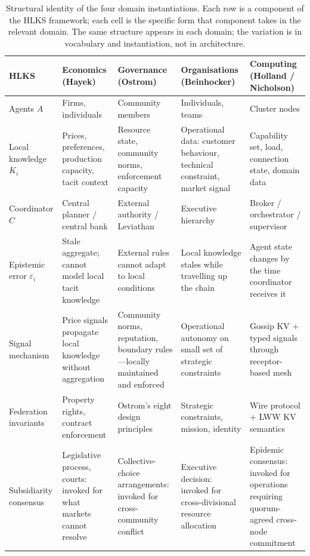 \documentclass[11pt]{article}
\theoremstyle{definition}
\theoremstyle{plain}
\theoremstyle{plain}
\begin{document}
\begin{table}[H]
\centering
\small
\begin{tabularx}{\textwidth}{lXXXX}
\toprule
\textbf{HLKS} &
\textbf{Economics} (Hayek) &
\textbf{Governance} (Ostrom) &
\textbf{Organisations} (Beinhocker) &
\textbf{Computing} (Holland / Nicholson) \\
\midrule
Agents $A$ &
Firms, individuals &
Community members &
Individuals, teams &
Cluster nodes \\
\addlinespace
Local knowledge $K_i$ &
Prices, preferences, production capacity, tacit context &
Resource state, community norms, enforcement capacity &
Operational data: customer behaviour, technical constraint, market signal &
Capability set, load, connection state, domain data \\
\addlinespace
Coordinator $C$ &
Central planner / central bank &
External authority / Leviathan &
Executive hierarchy &
Broker / orchestrator / supervisor \\
\addlinespace
Epistemic error $\varepsilon_i$ &
Stale aggregate; cannot model local tacit knowledge &
External rules cannot adapt to local conditions &
Local knowledge stales while travelling up the chain &
Agent state changes by the time coordinator receives it \\
\addlinespace
Signal mechanism &
Price signals propagate local knowledge without aggregation &
Community norms, reputation, boundary rules---locally maintained and enforced &
Operational autonomy on small set of strategic constraints &
Gossip KV + typed signals through receptor-based mesh \\
\addlinespace
Federation invariants &
Property rights, contract enforcement &
Ostrom's eight design principles &
Strategic constraints, mission, identity &
Wire protocol + LWW KV semantics \\
\addlinespace
Subsidiarity consensus &
Legislative process, courts: invoked for what markets cannot resolve &
Collective-choice arrangements: invoked for cross-community conflict &
Executive decision: invoked for cross-divisional resource allocation &
Epidemic consensus: invoked for operations requiring quorum-agreed cross-node commitment \\
\bottomrule
\end{tabularx}
\caption{Structural identity of the four domain instantiations. Each row is a
component of the HLKS framework; each cell is the specific form that
component takes in the relevant domain. The same structure appears in each
domain; the variation is in vocabulary and instantiation, not in
architecture.}
\label{tab:identity}
\end{table}
\end{document}
